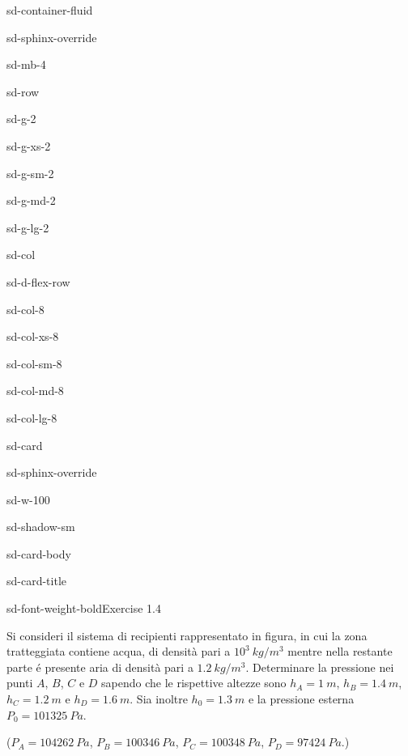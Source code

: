 \documentclass[letterpaper,10pt,italian]{jupyterBook}
\begin{document}
\begin{sphinxuseclass}{sd-container-fluid}
\begin{sphinxuseclass}{sd-sphinx-override}
\begin{sphinxuseclass}{sd-mb-4}
\begin{sphinxuseclass}{sd-row}
\begin{sphinxuseclass}{sd-g-2}
\begin{sphinxuseclass}{sd-g-xs-2}
\begin{sphinxuseclass}{sd-g-sm-2}
\begin{sphinxuseclass}{sd-g-md-2}
\begin{sphinxuseclass}{sd-g-lg-2}
\begin{sphinxuseclass}{sd-col}
\begin{sphinxuseclass}{sd-d-flex-row}
\begin{sphinxuseclass}{sd-col-8}
\begin{sphinxuseclass}{sd-col-xs-8}
\begin{sphinxuseclass}{sd-col-sm-8}
\begin{sphinxuseclass}{sd-col-md-8}
\begin{sphinxuseclass}{sd-col-lg-8}
\begin{sphinxuseclass}{sd-card}
\begin{sphinxuseclass}{sd-sphinx-override}
\begin{sphinxuseclass}{sd-w-100}
\begin{sphinxuseclass}{sd-shadow-sm}
\begin{sphinxuseclass}{sd-card-body}
\begin{sphinxuseclass}{sd-card-title}
\begin{sphinxuseclass}{sd-font-weight-bold}Exercise 1.4
\end{sphinxuseclass}
\end{sphinxuseclass}
\sphinxAtStartPar
Si consideri il sistema di recipienti rappresentato in figura, in cui
la zona tratteggiata contiene acqua, di densità pari a \(10^3\ kg/m^3\) mentre nella restante parte é
presente aria di densità pari a \(1.2\ kg/m^3\). Determinare la pressione nei punti \(A\), \(B\), \(C\) e \(D\)
sapendo che le rispettive altezze sono \(h_A=1\ m\), \(h_B=1.4\ m\),
\(h_C=1.2\ m\) e \(h_D=1.6\ m\). Sia inoltre \(h_0=1.3\ m\) e la pressione
esterna \(P_0=101325\ Pa\).

\sphinxAtStartPar
(\(P_A=104262\ Pa\), \(P_B=100346\ Pa\), \(P_C=100348\ Pa\), \(P_D=97424\ Pa\).)


\end{sphinxuseclass}
\end{sphinxuseclass}
\end{sphinxuseclass}
\end{sphinxuseclass}
\end{sphinxuseclass}
\end{sphinxuseclass}
\end{sphinxuseclass}
\end{sphinxuseclass}
\end{sphinxuseclass}
\end{sphinxuseclass}
\end{sphinxuseclass}
\end{sphinxuseclass}
\end{sphinxuseclass}
\end{sphinxuseclass}
\end{sphinxuseclass}
\end{sphinxuseclass}
\end{sphinxuseclass}
\end{sphinxuseclass}
\end{sphinxuseclass}
\end{sphinxuseclass}
\end{sphinxuseclass}
\end{document}
